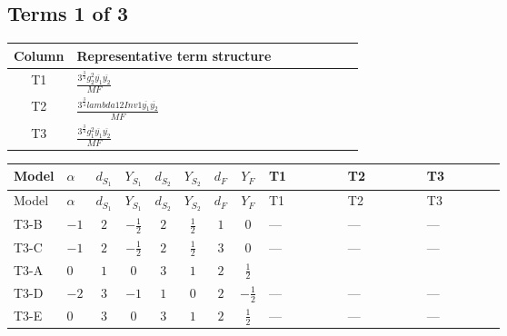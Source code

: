 \documentclass[8pt]{article}
\begin{document}
\begin{landscape}
\subsection*{Terms 1 of 3}
\begin{center}
\begin{tabular}{@{}c >{\raggedright\arraybackslash}p{0.82\linewidth}@{}}
\toprule
Column & Representative term structure \\
\midrule
T1 & \(\displaystyle \frac{3^{\frac{3}{4}} g_{2}^{2} \overline{y_{1}} \overline{y_{2}}}{MF}\) \\
\midrule
T2 & \(\displaystyle \frac{3^{\frac{3}{4}} lambda12Inv1 \overline{y_{1}} \overline{y_{2}}}{MF}\) \\
\midrule
T3 & \(\displaystyle \frac{3^{\frac{3}{4}} g_{1}^{2} \overline{y_{1}} \overline{y_{2}}}{MF}\) \\
\midrule
\bottomrule
\end{tabular}
\end{center}
\smallskip
\tiny
\begin{longtable}{@{}llcccccc >{\raggedright\arraybackslash}p{0.21\linewidth} >{\raggedright\arraybackslash}p{0.21\linewidth} >{\raggedright\arraybackslash}p{0.21\linewidth}@{}}
\toprule
Model & $\alpha$ & $d_{S_1}$ & $Y_{S_1}$ & $d_{S_2}$ & $Y_{S_2}$ & $d_F$ & $Y_F$ & T1 & T2 & T3 \\
\midrule
\endfirsthead
\toprule
Model & $\alpha$ & $d_{S_1}$ & $Y_{S_1}$ & $d_{S_2}$ & $Y_{S_2}$ & $d_F$ & $Y_F$ & T1 & T2 & T3 \\
\midrule
\endhead
T3-B & $-1$ & $2$ & $-\frac{1}{2}$ & $2$ & $\frac{1}{2}$ & $1$ & $0$ & --- & --- & --- \\
\midrule
T3-C & $-1$ & $2$ & $-\frac{1}{2}$ & $2$ & $\frac{1}{2}$ & $3$ & $0$ & --- & --- & --- \\
\midrule
T3-A & $0$ & $1$ & $0$ & $3$ & $1$ & $2$ & $\frac{1}{2}$ & \scriptsize\adjustbox{max width=\linewidth}{$\begin{gathered} - \frac{11 \cdot 3^{\frac{3}{4}} g_{2}^{2} \overline{y_{1}} \overline{y_{2}}}{8 MF}\end{gathered}$} & \scriptsize\adjustbox{max width=\linewidth}{$\begin{gathered} - \frac{3^{\frac{3}{4}} lambda12Inv1 \overline{y_{1}} \overline{y_{2}}}{6 MF}\end{gathered}$} & \scriptsize\adjustbox{max width=\linewidth}{$\begin{gathered} - \frac{3^{\frac{3}{4}} g_{1}^{2} \overline{y_{1}} \overline{y_{2}}}{8 MF}\end{gathered}$} \\
\midrule
T3-D & $-2$ & $3$ & $-1$ & $1$ & $0$ & $2$ & $-\frac{1}{2}$ & --- & --- & --- \\
\midrule
T3-E & $0$ & $3$ & $0$ & $3$ & $1$ & $2$ & $\frac{1}{2}$ & --- & --- & --- \\
\midrule
\bottomrule
\end{longtable}
\clearpage

\end{landscape}
\end{document}
